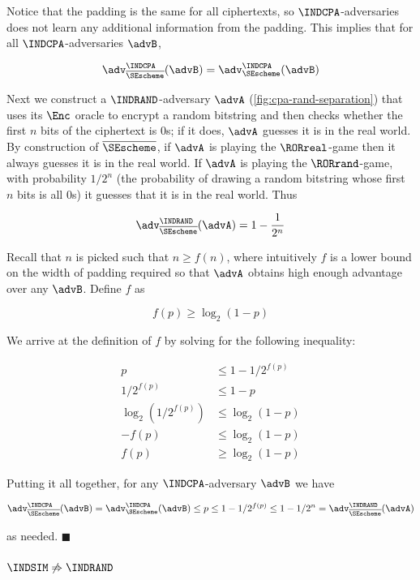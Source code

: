 Notice that the padding is the same for all ciphertexts, so
$\INDCPA$-adversaries does not learn any additional information from the
padding. This implies that for all $\INDCPA$-adversaries $\advB$,

$$
\adv_{\overline{\SEscheme}}^{\INDCPA}(\advB) = \adv_{\SEscheme}^{\INDCPA}(\advB)
$$

Next we construct a $\INDRAND$-adversary $\advA$ (\cref{fig:cpa-rand-separation})
that uses its $\Enc$ oracle to encrypt a random bitstring and then checks
whether the first $n$ bits of the ciphertext is 0s;
if it does, $\advA$ guesses it is in the real world.
By construction of $\overline{\SEscheme}$, if $\advA$ is playing the
$\RORreal$-game then it always guesses it is in the real world.
If $\advA$ is playing the $\RORrand$-game, with probability $1 / 2^n$
(the probability of drawing a random bitstring whose first $n$ bits is all 0s)
it guesses that it is in the real world. Thus 

$$
\adv_{\overline{\SEscheme}}^{\INDRAND}(\advA) = 1 - \frac{1}{2^n}
$$

Recall that $n$ is picked such that $n \geq f(n)$, where intuitively $f$ is a
lower bound on the width of padding required so that $\advA$ obtains high enough
advantage over any $\advB$. Define $f$ as

$$
f(p) \geq \log_2(1 - p)
$$

We arrive at the definition of $f$ by solving for the following inequality:

\begin{align*}
  p &\leq 1 - 1 / 2^{f(p)} \\
  1 / 2^{f(p)} &\leq 1 - p \\
  \log_2(1 / 2^{f(p)}) &\leq \log_2(1 - p) \\
  - f(p) &\leq \log_2(1 - p) \\
  f(p) &\geq \log_2(1 - p)
\end{align*}

Putting it all together, for any $\INDCPA$-adversary $\advB$ we have

$$
  \adv_{\overline{\SEscheme}}^{\INDCPA}(\advB)
  = \adv_{\SEscheme}^{\INDCPA}(\advB) \\
  \leq p \\
  \leq 1 - 1 / 2^{f(p)} \\
  \leq 1 - 1 / 2^n \\
  = \adv_{\overline{\SEscheme}}^{\INDRAND}(\advA)
$$

as needed. $\blacksquare$

\subsubsection*{$\INDSIM \not\Rightarrow \INDRAND$}

